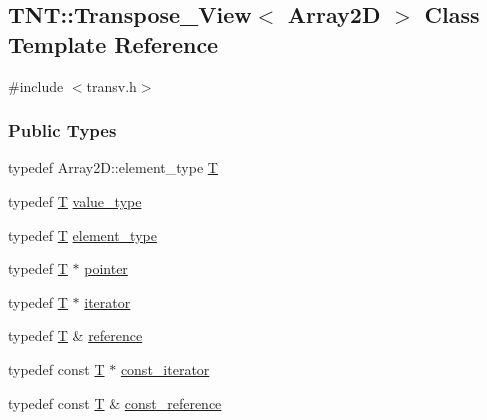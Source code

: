 \subsection{TNT::Transpose\_\-View$<$ Array2D $>$ Class Template Reference}
\label{class_t_n_t_1_1_transpose___view}


{\ttfamily \#include $<$transv.h$>$}

\subsubsection*{Public Types}
\begin{DoxyCompactItemize}
\item 
typedef Array2D::element\_\-type \hyperlink{class_t_n_t_1_1_transpose___view_aed45bbf8d9e4548019f46484862be300}{T}
\item 
typedef \hyperlink{class_t_n_t_1_1_transpose___view_aed45bbf8d9e4548019f46484862be300}{T} \hyperlink{class_t_n_t_1_1_transpose___view_a79f99ff0342c9bb0267745dd5c3e416e}{value\_\-type}
\item 
typedef \hyperlink{class_t_n_t_1_1_transpose___view_aed45bbf8d9e4548019f46484862be300}{T} \hyperlink{class_t_n_t_1_1_transpose___view_a4b6a3486e7c7637f1d4af06218b0e767}{element\_\-type}
\item 
typedef \hyperlink{class_t_n_t_1_1_transpose___view_aed45bbf8d9e4548019f46484862be300}{T} $\ast$ \hyperlink{class_t_n_t_1_1_transpose___view_af9d41194fce8c4a880fa810ec4733ef1}{pointer}
\item 
typedef \hyperlink{class_t_n_t_1_1_transpose___view_aed45bbf8d9e4548019f46484862be300}{T} $\ast$ \hyperlink{class_t_n_t_1_1_transpose___view_a639d17bd5a79b02d3d6f52a18a10d578}{iterator}
\item 
typedef \hyperlink{class_t_n_t_1_1_transpose___view_aed45bbf8d9e4548019f46484862be300}{T} \& \hyperlink{class_t_n_t_1_1_transpose___view_a69899e03b1d06e813ca3952666a85c39}{reference}
\item 
typedef const \hyperlink{class_t_n_t_1_1_transpose___view_aed45bbf8d9e4548019f46484862be300}{T} $\ast$ \hyperlink{class_t_n_t_1_1_transpose___view_a4eee446cd2b0c526ea7ec2da820dd012}{const\_\-iterator}
\item 
typedef const \hyperlink{class_t_n_t_1_1_transpose___view_aed45bbf8d9e4548019f46484862be300}{T} \& \hyperlink{class_t_n_t_1_1_transpose___view_adef63f90c184dfd85d499febacfb368f}{const\_\-reference}
\end{DoxyCompactItemize}
